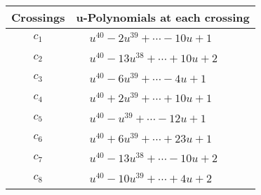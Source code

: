\documentclass[1p]{elsarticle_modified}
\theoremstyle{definition}
\begin{document}
\begin{tabular}{m{50pt}|m{274pt}}
Crossings & \hspace{64pt}u-Polynomials at each crossing \\
\hline $$\begin{aligned}c_{1}\end{aligned}$$&$\begin{aligned}
&u^{40}-2 u^{39}+\cdots-10 u+1
\end{aligned}$\\
\hline $$\begin{aligned}c_{2}\end{aligned}$$&$\begin{aligned}
&u^{40}-13 u^{38}+\cdots+10 u+2
\end{aligned}$\\
\hline $$\begin{aligned}c_{3}\end{aligned}$$&$\begin{aligned}
&u^{40}-6 u^{39}+\cdots-4 u+1
\end{aligned}$\\
\hline $$\begin{aligned}c_{4}\end{aligned}$$&$\begin{aligned}
&u^{40}+2 u^{39}+\cdots+10 u+1
\end{aligned}$\\
\hline $$\begin{aligned}c_{5}\end{aligned}$$&$\begin{aligned}
&u^{40}- u^{39}+\cdots-12 u+1
\end{aligned}$\\
\hline $$\begin{aligned}c_{6}\end{aligned}$$&$\begin{aligned}
&u^{40}+6 u^{39}+\cdots+23 u+1
\end{aligned}$\\
\hline $$\begin{aligned}c_{7}\end{aligned}$$&$\begin{aligned}
&u^{40}-13 u^{38}+\cdots-10 u+2
\end{aligned}$\\
\hline $$\begin{aligned}c_{8}\end{aligned}$$&$\begin{aligned}
&u^{40}-10 u^{39}+\cdots+4 u+2
\end{aligned}$\\

\end{tabular}
\end{document}
